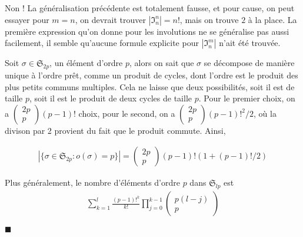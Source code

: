 \documentclass{article}
\newcommand*{\QED}{\hfill\ensuremath{\blacksquare}}%
\begin{document}
Non ! La généralisation précédente est totalement fausse, et pour cause, on peut essayer pour $m = n$, on devrait trouver $|\mathfrak{I}_n^n| = n!$, mais on trouve $2$ à la place. La première expression qu'on donne pour les involutions ne se généralise pas aussi facilement, il semble qu'aucune formule explicite pour $|\mathfrak{I}_n^m|$ n'ait été trouvée. 

Soit $\sigma\in \mathfrak{S}_{2p}$, un élément d'ordre $p$, alors on sait que $\sigma$ se décompose de manière unique à l'ordre prêt, comme un produit de cycles, dont l'ordre est le produit des plus petits communs multiples. Cela ne laisse que deux possibilités, soit il est de taille $p$, soit il est le produit de deux cycles de taille $p$. Pour le premier choix, on a $\begin{pmatrix}2p\\p\end{pmatrix}(p-1)!$ choix, pour le second, on a $\begin{pmatrix} 2p\\p\end{pmatrix}(p-1)!^2/2$, où la divison par 2 provient du fait que le produit commute. Ainsi, 

\begin{align*}
	|\{\sigma\in \mathfrak{S}_{2p} : o(\sigma)=p\}| = \begin{pmatrix} 2p\\p\end{pmatrix}(p-1)!(1+(p-1)!/2)
\end{align*}

Plus généralement, le nombre d'éléments d'ordre $p$ dans $\mathfrak{S}_{lp}$ est 
\begin{align*}
	\sum_{k=1}^l \frac{(p-1)!^k}{k!}\prod_{j=0}^{k-1}\begin{pmatrix} p(l-j)\\p\end{pmatrix}
\end{align*}

\QED
\end{document}
